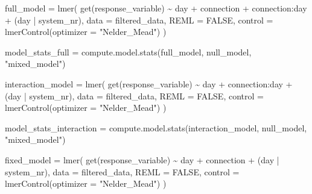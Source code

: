 \documentclass[
]{article}
\newenvironment{Shaded}{\begin{snugshade}}{\end{snugshade}}
\newcommand{\AttributeTok}[1]{\textcolor[rgb]{0.77,0.63,0.00}{#1}}
\newcommand{\ConstantTok}[1]{\textcolor[rgb]{0.00,0.00,0.00}{#1}}
\newcommand{\FunctionTok}[1]{\textcolor[rgb]{0.00,0.00,0.00}{#1}}
\newcommand{\NormalTok}[1]{#1}
\newcommand{\OtherTok}[1]{\textcolor[rgb]{0.56,0.35,0.01}{#1}}
\newcommand{\SpecialCharTok}[1]{\textcolor[rgb]{0.00,0.00,0.00}{#1}}
\newcommand{\StringTok}[1]{\textcolor[rgb]{0.31,0.60,0.02}{#1}}
\begin{document}
\begin{Shaded}
\begin{Highlighting}[]
\NormalTok{  full\_model }\OtherTok{=} \FunctionTok{lmer}\NormalTok{(}
    \FunctionTok{get}\NormalTok{(response\_variable) }\SpecialCharTok{\textasciitilde{}}
\NormalTok{      day }\SpecialCharTok{+}
\NormalTok{      connection }\SpecialCharTok{+}
\NormalTok{      connection}\SpecialCharTok{:}\NormalTok{day }\SpecialCharTok{+}
\NormalTok{      (day }\SpecialCharTok{|}\NormalTok{ system\_nr),}
    \AttributeTok{data =}\NormalTok{ filtered\_data,}
    \AttributeTok{REML =} \ConstantTok{FALSE}\NormalTok{,}
    \AttributeTok{control =} \FunctionTok{lmerControl}\NormalTok{(}\AttributeTok{optimizer =} \StringTok{"Nelder\_Mead"}\NormalTok{)}
\NormalTok{  )}
  
\NormalTok{  model\_stats\_full }\OtherTok{=} \FunctionTok{compute.model.stats}\NormalTok{(full\_model,}
\NormalTok{                                         null\_model,}
                                         \StringTok{"mixed\_model"}\NormalTok{)}
  
\NormalTok{  interaction\_model }\OtherTok{=} \FunctionTok{lmer}\NormalTok{(}
    \FunctionTok{get}\NormalTok{(response\_variable) }\SpecialCharTok{\textasciitilde{}}
\NormalTok{      day }\SpecialCharTok{+}
\NormalTok{      connection}\SpecialCharTok{:}\NormalTok{day }\SpecialCharTok{+}
\NormalTok{      (day }\SpecialCharTok{|}\NormalTok{ system\_nr),}
    \AttributeTok{data =}\NormalTok{ filtered\_data,}
    \AttributeTok{REML =} \ConstantTok{FALSE}\NormalTok{,}
    \AttributeTok{control =} \FunctionTok{lmerControl}\NormalTok{(}\AttributeTok{optimizer =} \StringTok{"Nelder\_Mead"}\NormalTok{)}
\NormalTok{  )}
  
\NormalTok{  model\_stats\_interaction }\OtherTok{=} \FunctionTok{compute.model.stats}\NormalTok{(interaction\_model,}
\NormalTok{                                                null\_model,}
                                                \StringTok{"mixed\_model"}\NormalTok{)}
  
\NormalTok{  fixed\_model }\OtherTok{=} \FunctionTok{lmer}\NormalTok{(}
    \FunctionTok{get}\NormalTok{(response\_variable) }\SpecialCharTok{\textasciitilde{}}
\NormalTok{      day }\SpecialCharTok{+}
\NormalTok{      connection }\SpecialCharTok{+}
\NormalTok{      (day }\SpecialCharTok{|}\NormalTok{ system\_nr),}
    \AttributeTok{data =}\NormalTok{ filtered\_data,}
    \AttributeTok{REML =} \ConstantTok{FALSE}\NormalTok{,}
    \AttributeTok{control =} \FunctionTok{lmerControl}\NormalTok{(}\AttributeTok{optimizer =} \StringTok{"Nelder\_Mead"}\NormalTok{)}
\NormalTok{  )}
  

\end{Highlighting}
\end{Shaded}
\end{document}
